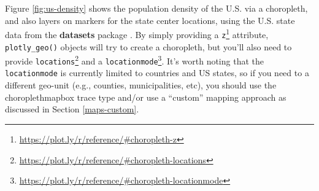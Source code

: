 \documentclass[
  12pt,
]{krantz}
\newenvironment{Shaded}{\begin{snugshade}}{\end{snugshade}}
\newcommand{\DataTypeTok}[1]{\textcolor[rgb]{0.13,0.29,0.53}{#1}}
\newcommand{\DecValTok}[1]{\textcolor[rgb]{0.00,0.00,0.81}{#1}}
\newcommand{\KeywordTok}[1]{\textcolor[rgb]{0.13,0.29,0.53}{\textbf{#1}}}
\newcommand{\NormalTok}[1]{#1}
\newcommand{\OperatorTok}[1]{\textcolor[rgb]{0.81,0.36,0.00}{\textbf{#1}}}
\newcommand{\StringTok}[1]{\textcolor[rgb]{0.31,0.60,0.02}{#1}}
\renewcommand{\href}[2]{#2\footnote{\url{#1}}}
\begin{document}
Figure \ref{fig:us-density} shows the population density of the U.S. via a choropleth, and also layers on markers for the state center locations, using the U.S. state data from the \textbf{datasets} package \citep{RCore}. By simply providing a \href{https://plot.ly/r/reference/\#choropleth-z}{\texttt{z}} attribute, \texttt{plotly\_geo()} objects will try to create a choropleth, but you'll also need to provide \href{https://plot.ly/r/reference/\#choropleth-locations}{\texttt{locations}} and a \href{https://plot.ly/r/reference/\#choropleth-locationmode}{\texttt{locationmode}}. It's worth noting that the \texttt{locationmode} is currently limited to countries and US states, so if you need to a different geo-unit (e.g., counties, municipalities, etc), you should use the choroplethmapbox trace type and/or use a ``custom'' mapping approach as discussed in Section \ref{maps-custom}.

\begin{Shaded}
\end{Shaded}
\end{document}
